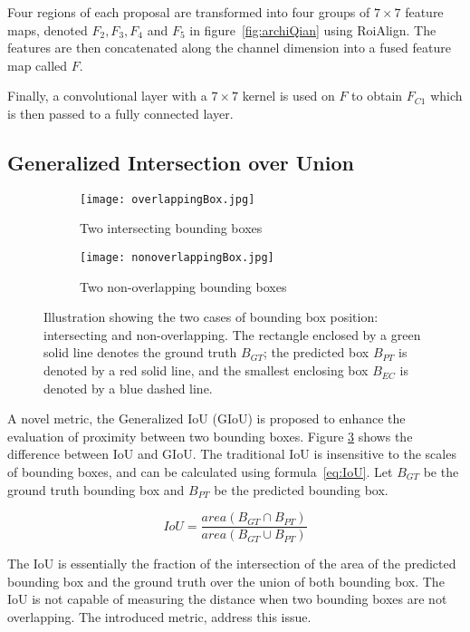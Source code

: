 Four regions of each proposal are transformed into four groups of $7 \times 7$ feature maps, denoted $F_2, F_3, F_4$ and $F_5$ in figure~\ref{fig:archiQian} using RoiAlign\cite{resNet}. The features are then concatenated along the channel dimension into a fused feature map called $F$.

Finally, a convolutional layer with a $7 \times 7$ kernel is used on $F$ to obtain $F_{C1}$ which is then passed to a fully connected layer.


\subsection{Generalized Intersection over Union}

\begin{figure}[h!]
\begin{subfigure}{.5\textwidth}
  \centering
  \texttt{[image: overlappingBox.jpg]}  
  \caption{Two intersecting bounding boxes}
  \label{fig:sub-first}
\end{subfigure}
\begin{subfigure}{.5\textwidth}
  \centering
  \texttt{[image: nonoverlappingBox.jpg]}  
  \caption{Two non-overlapping bounding boxes}
  \label{fig:sub-second}
\end{subfigure}
	\caption{Illustration showing the two cases of bounding box position: intersecting and non-overlapping. The rectangle enclosed by a green solid line denotes the ground truth $B_{GT}$; the predicted box $B_{PT}$ is denoted by a red solid line, and the smallest enclosing box $B_{EC}$ is denoted by a blue dashed line.}
\label{fig:giou}
\end{figure}


A novel metric, the Generalized IoU (GIoU) is proposed to enhance the evaluation of proximity between two bounding boxes. Figure \ref{fig:giou} shows the difference between IoU and GIoU. The traditional IoU is insensitive to the scales of bounding boxes, and can be calculated using formula~\ref{eq:IoU}. Let $B_{GT}$ be the ground truth bounding box and $B_{PT}$ be the predicted bounding box.

\begin{equation}\label{eq:IoU}
	IoU = \frac{area(B_{GT} \cap B_{PT})}{area(B_{GT} \cup B_{PT})}
\end{equation}

The IoU is essentially the fraction of the intersection of the area of the predicted bounding box and the ground truth over the union of both bounding box. The IoU is not capable of measuring the distance when two bounding boxes are not overlapping. The introduced metric, address this issue.

